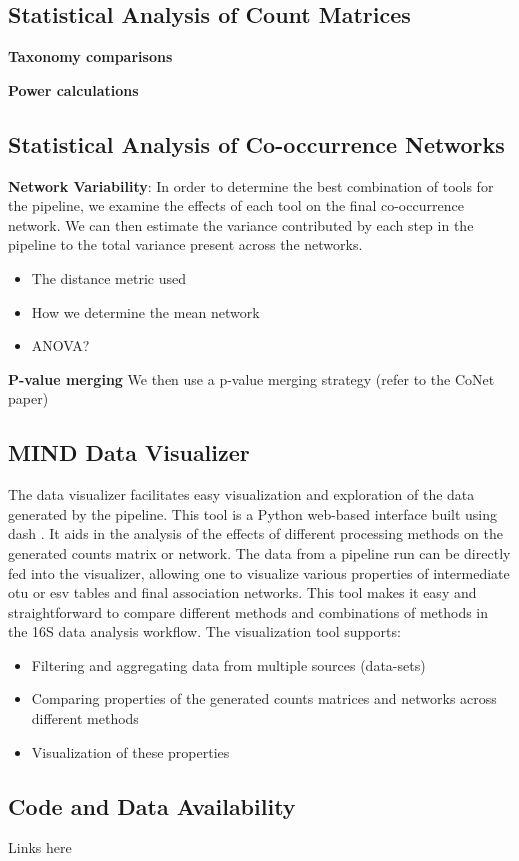   \subsection*{Statistical Analysis of Count Matrices}

   \textbf{Taxonomy comparisons}

    \textbf{Power calculations}

  \subsection*{Statistical Analysis of Co-occurrence Networks}

    \textbf{Network Variability}:
    In order to determine the best combination of tools for the pipeline, we examine the effects of each tool on the final co-occurrence network.
    We can then estimate the variance contributed by each step in the pipeline to the total variance present across the networks.
    \begin{itemize}
      \item The distance metric used
      \item How we determine the mean network
      \item ANOVA?
    \end{itemize}

    \textbf{P-value merging}
    We then use a p-value merging strategy (refer to the CoNet paper)

  \subsection*{MIND Data Visualizer}

    The data visualizer facilitates easy visualization and exploration of the data generated by the pipeline.
    This tool is a Python web-based interface built using dash \cite{dash}.
    It aids in the analysis of the effects of different processing methods on the generated counts matrix or network.
    The data from a pipeline run can be directly fed into the visualizer, allowing one to visualize various properties of intermediate \ac{otu} or \ac{esv} tables and final association networks.
    This tool makes it easy and straightforward to compare different methods and combinations of methods in the 16S data analysis workflow. The visualization tool supports:
    \begin{itemize}
      \item Filtering and aggregating data from multiple sources (data-sets)
      \item Comparing properties of the generated counts matrices and networks across different methods
      \item Visualization of these properties
    \end{itemize}

  \subsection*{Code and Data Availability}

    Links here
